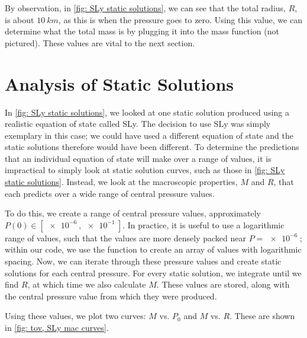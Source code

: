 By observation, in \autoref{fig: SLy static solutions}, we can see that the total radius, $R$, is about $\SI{10}{km}$, as this is when the pressure goes to zero. Using this value, we can determine what the total mass is by plugging it into the mass function (not pictured). These values are vital to the next section.



\section{Analysis of Static Solutions}


In \autoref{fig: SLy static solutions}, we looked at one static solution produced using a realistic equation of state called SLy. The decision to use SLy was simply exemplary in this case; we could have used a different equation of state and the static solutions therefore would have been different. To determine the predictions that an individual equation of state will make over a range of values, it is impractical to simply look at static solution curves, such as those in \autoref{fig: SLy static solutions}. Instead, we look at the macroscopic properties, $M$ and $R$, that each predicts over a wide range of central pressure values.

To do this, we create a range of central pressure values, approximately $P(0)\in [\SI{e-6}{}, \SI{e-1}{}]$. In practice, it is useful to use a logarithmic range of values, such that the values are more densely packed near $P=\SI{e-6}{}$; within our code, we use the  function  to create an array of values with logarithmic spacing. Now, we can iterate through these pressure values and create static solutions for each central pressure. For every static solution, we integrate until we find $R$, at which time we also calculate $M$. These values are stored, along with the central pressure value from which they were produced.

Using these values, we plot two curves: $M$ vs. $P_0$ and $M$ vs. $R$. These are shown in \autoref{fig: tov, SLy mac curves}.

